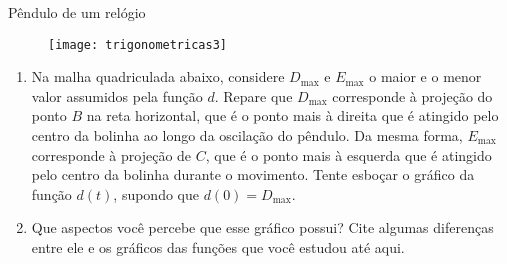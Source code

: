 \begin{task}{Pêndulo de um relógio}
\begin{figure}[H]
\centering

\texttt{[image: trigonometricas3]}
\end{figure}

\begin{enumerate}
\item Na malha quadriculada abaixo, considere $D_{\max}$ e $E_{\max}$ o maior e o menor valor assumidos pela função $d$. Repare que $D_{\max}$ corresponde à projeção do ponto $B$ na reta horizontal, que é o ponto mais à direita que é atingido pelo centro da bolinha ao longo da oscilação do pêndulo. Da mesma forma, $E_{\max}$ corresponde à projeção de $C$, que é o ponto mais à esquerda que é atingido pelo centro da bolinha durante o movimento. Tente esboçar o gráfico da função $d(t)$, supondo que $d(0) = D_{\max}$.

\begin{figure}[H]
\centering

\resizebox{.7\linewidth}{!}
{
}
\end{figure}

\item Que aspectos você percebe que esse gráfico possui? Cite algumas diferenças entre ele e os gráficos das funções que você estudou até aqui.
\end{enumerate}
\end{task}

